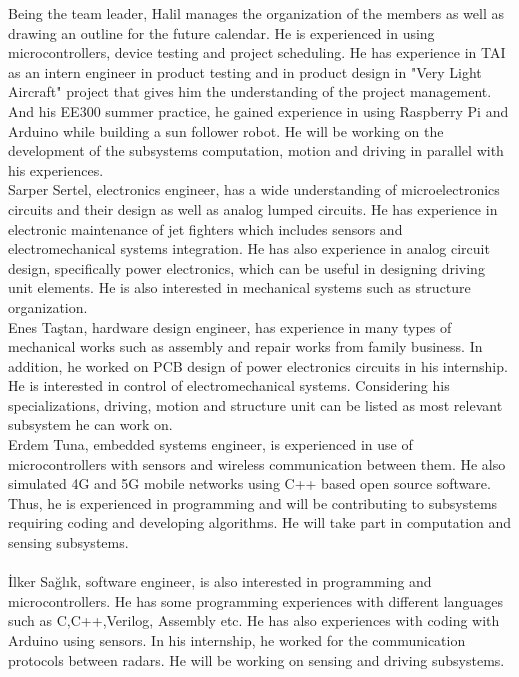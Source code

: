 \documentclass[a4paper,12pt]{article}
\begin{document}
	Being the team leader, Halil manages the organization of the members as well as drawing an outline for the future calendar. He is experienced in using microcontrollers, device testing and project scheduling. He has experience in TAI as an intern engineer in product testing and in product design in "Very Light Aircraft" project that gives him the understanding of the project management. And his EE300 summer practice, he gained experience in using Raspberry Pi and Arduino while building a sun follower robot. He will be working on the development of the subsystems computation, motion and driving in parallel with his experiences.\\
	
	Sarper Sertel, electronics engineer, has a wide understanding of microelectronics circuits and their design as well as analog lumped circuits. He has experience in electronic maintenance of jet fighters which includes sensors and electromechanical systems integration. He has also experience in  analog circuit design, specifically power electronics, which can be useful in designing driving unit elements. He is also interested in mechanical systems such as structure organization.\\
	
	Enes Taştan, hardware design engineer, has experience in many types of mechanical works such as assembly and repair works from family business. In addition, he worked on PCB design of power electronics circuits in his internship. He is interested in control of electromechanical systems. Considering his specializations, driving, motion and structure unit can be listed as most relevant subsystem he can work on.\\
	
	Erdem Tuna, embedded systems engineer, is experienced in use of microcontrollers with sensors and wireless communication between them. He also simulated 4G and 5G mobile networks using C++ based open source software. Thus, he is experienced in programming and will be contributing to subsystems requiring coding and developing algorithms. He will take part in computation and sensing subsystems.\\
	\\
	
	İlker Sağlık, software engineer, is also interested in programming and microcontrollers. He has some programming experiences with different languages such as C,C++,Verilog, Assembly etc. He has also experiences with coding with Arduino using sensors. In his internship, he worked for the communication protocols between radars. He will be working on sensing and driving subsystems.
\end{document}
